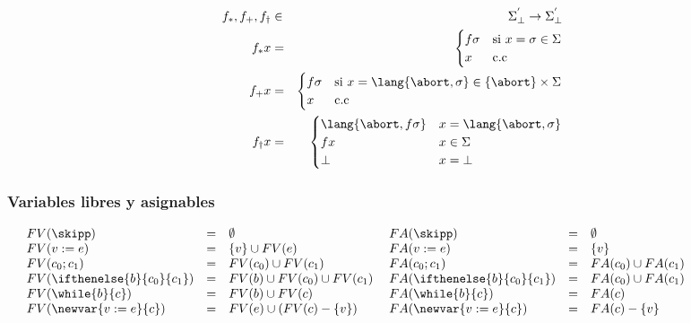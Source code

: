 \begin{multicols}{2}
          \begin{eqnarray*}
                                f_{\ast}, f_{+}, f_{\dag} &\in& \Sigma^{'}_{\bot} \rightarrow \Sigma^{'}_{\bot} \\
          f_{\ast} x &=& \begin{cases}
                          f \sigma & \text{si } x = \sigma \in \Sigma \\
                          x & \text{c.c}
                        \end{cases} \\
          f_{+} x &=& \begin{cases}
                        f \sigma & \text{si } x = \lang{\abort, \sigma} \in \{\abort\} \times \Sigma\\
                        x & \text{c.c}
                      \end{cases} \\
          f_{\dag} x &=& \begin{cases}
                          \lang{\abort, f \sigma} & x = \lang{\abort, \sigma} \\
                          f x & x \in \Sigma \\
                          \bot & x = \bot
                        \end{cases} \\
        \end{eqnarray*}
      \end{multicols}

    \subsubsection*{Variables libres y asignables}
      $\begin{array}{lllllll}
        & FV(\skipp) &=& \emptyset  &\; FA(\skipp) &=& \emptyset \\
        & FV(v:=e) &=& \{v\} \cup FV(e)  &\; FA(v:=e) &=& \{v\} \\
        & FV(c_{0};c_1) &=& FV(c_0) \cup FV(c_{1})  &\; FA(c_0;c_1) &=& FA(c_0) \cup FA(c_1) \\
        & FV(\ifthenelse{b}{c_0}{c_1}) &=& FV(b) \cup FV(c_0) \cup FV(c_1)  &\; FA(\ifthenelse{b}{c_0}{c_1}) &=& FA(c_0) \cup FA(c_1)\\
        & FV(\while{b}{c}) &=& FV(b) \cup FV(c) &\; FA(\while{b}{c}) &=& FA(c) \\
        & FV(\newvar{v:=e}{c}) &=& FV(e) \cup (FV(c) - \{v\})  &\; FA(\newvar{v:=e}{c}) &=& FA(c) - \{v\} \\
      \end{array}$

